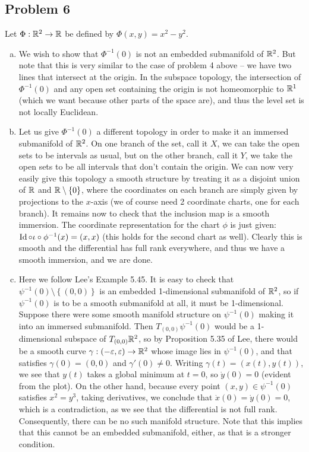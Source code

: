 \documentclass{../../mathnotes}
\begin{document}
\subsection*{Problem 6}
Let $\Phi:\mathbb{R}^2\to\mathbb{R}$ be defined by $\Phi(x,y)=x^2-y^2$.
\begin{enumerate}[(a)]
    \item We wish to show that $\Phi^{-1}(0)$ is not an embedded submanifold of $\mathbb{R}^2$. But note that this is
        very similar to the case of problem 4 above -- we have two lines that intersect at the origin. In the subspace
        topology, the intersection of $\Phi^{-1}(0)$ and any open set containing the origin is not homeomorphic to $\mathbb{R}^1$ (which we want because other parts of the
        space are), and thus the level set is not locally Euclidean.
    \item Let us give $\Phi^{-1}(0)$ a different topology in order to make it an immersed submanifold of $\mathbb{R}^2$. On
        one branch of the set, call it $X$, we can take the open sets to be intervals as usual, but on the other branch, call it $Y$,
        we take the open sets to be all intervals that don't contain the origin. We can now very easily give this topology
        a smooth structure by treating it as a disjoint union of $\mathbb{R}$ and $\mathbb{R}\setminus \left\{ 0 \right\}$, where the coordinates
        on each branch are simply given by projections to the $x$-axis (we of course need 2 coordinate charts, one for each branch).
        It remains now to check that the inclusion map is
        a smooth immersion. The coordinate representation for the chart $\phi$ is just given: $\operatorname{Id}\circ\iota\circ\phi^{-1}(x)=(x,x)$ (this holds for the second
        chart as well). Clearly this is smooth
        and the differential has full rank everywhere, and thus we have a smooth immersion, and we are done.
    \item Here we follow Lee's Example 5.45.
        It is easy to check that $\psi^{-1}(0)\setminus\left\{ (0,0) \right\}$ is an embedded 1-dimensional submanifold of $\mathbb{R}^2$,
        so if $\psi^{-1}(0)$ is to be a smooth submanifold at all, it must be 1-dimensional. Suppose there were some smooth manifold
        structure on $\psi^{-1}(0)$ making it into an immersed submanifold. Then $T_{(0,0)}\psi^{-1}(0)$ would be a 1-dimensional
        subspace of $T_{(0,0)}\mathbb{R}^2$, so by Proposition 5.35 of Lee, there would be a smooth curve $\gamma:(-\varepsilon,\varepsilon)\to\mathbb{R}^2$
        whose image lies in $\psi^{-1}(0)$, and that satisfies $\gamma(0)=(0,0)$ and $\gamma'(0)\neq0$. Writing $\gamma(t)=(x(t),y(t))$,
        we see that $y(t)$ takes a global minimum at $t=0$, so $\dot y(0)=0$ (evident from the plot). On the other hand, because every
        point $(x,y)\in\psi^{-1}(0)$ satisfies $x^2=y^3$, taking derivatives, we conclude that $\dot x(0)=\dot y(0)=0$, which is a contradiction, as
        we see that the differential is not full rank. Consequently, there can be no such manifold structure.
        Note that this implies that this cannot be an embedded submanifold, either, as that is a stronger condition.
\end{enumerate}
\end{document}
